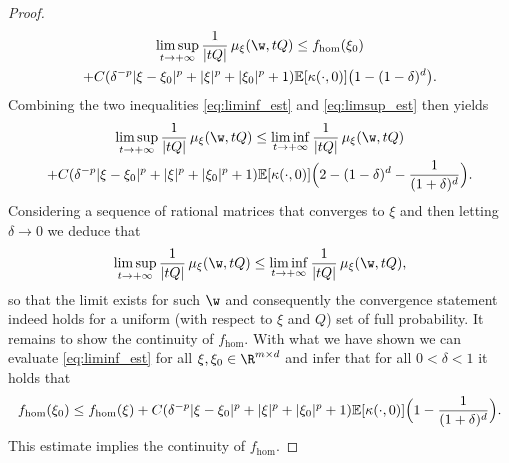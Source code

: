 \begin{proof}
\begin{multline}
\limsup_{t\to +\infty}\frac{1}{|tQ|}\,\mu_{\xi}(\w,tQ)\leq f_{\hom}(\xi_0)
\\
+C(\delta^{-p}|\xi-\xi_0|^p+|\xi|^p+|\xi_0|^p+1)\mathbb{E}[\kappa(\cdot,0)]\bigl(1-(1-\delta)^d\bigr).
\end{multline}
Combining the two inequalities \eqref{eq:liminf_est} and \eqref{eq:limsup_est} then yields
\begin{multline*}
\limsup_{t\to +\infty}\frac{1}{|tQ|}\,\mu_{\xi}(\w,tQ)\leq \liminf_{t\to +\infty}\frac{1}{|tQ|}\,\mu_{\xi}(\w,tQ)
\\
+C(\delta^{-p}|\xi-\xi_0|^p+|\xi|^p+|\xi_0|^p+1)\mathbb{E}[\kappa(\cdot,0)]\Bigl(2-(1-\delta)^d-\frac{1}{(1+\delta)^d}\Bigr).
\end{multline*}
Considering a sequence of rational matrices that converges to $\xi$ and then letting $\delta\to 0$ we deduce that
\begin{equation*}
\limsup_{t\to +\infty}\frac{1}{|tQ|}\,\mu_{\xi}(\w,tQ)\leq \liminf_{t\to +\infty}\frac{1}{|tQ|}\,\mu_{\xi}(\w,tQ),
\end{equation*}
so that the limit exists for such $\w$ and consequently the convergence statement indeed holds for a uniform (with respect to $\xi$ and $Q$) set of full probability. It remains to show the continuity of $f_{\hom}$. With what we have shown we can evaluate \eqref{eq:liminf_est} for all $\xi,\xi_0\in\R^{m\times d}$ and infer that for all $0<\delta<1$ it holds that
\begin{equation*}
f_{\hom}(\xi_0)\leq f_{\hom}(\xi)+C(\delta^{-p}|\xi-\xi_0|^p+|\xi|^p+|\xi_0|^p+1)\mathbb{E}[\kappa(\cdot,0)]\Bigl(1-\frac{1}{(1+\delta)^d}\Bigr).
\end{equation*}
This estimate implies the continuity of $f_{\hom}$.
\end{proof}


